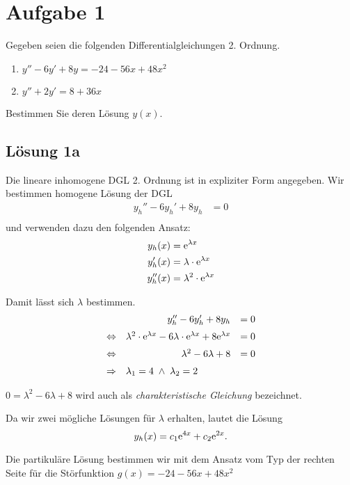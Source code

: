 \documentclass[main.tex]{subfiles}
\begin{document}
\section{Aufgabe 1}
Gegeben seien die folgenden Differentialgleichungen 2. Ordnung.
\begin{enumerate}
    \item $y'' - 6y' + 8y = -24 -56x + 48x^2$
    \item $y'' + 2y' = 8 + 36x$
\end{enumerate}
Bestimmen Sie deren Lösung $y(x)$.

\subsection{Lösung 1a}
Die lineare inhomogene DGL 2. Ordnung ist in expliziter Form angegeben.
Wir bestimmen homogene Lösung der DGL
\begin{align*}
    y_h'' - 6y_h' + 8y_h &= 0 \\
\end{align*}
und verwenden dazu den folgenden Ansatz:
\begin{align*}
    y_h(x) &= \mathrm{e}^{\lambda x} \\
    y_h'(x) &= \lambda\cdot \mathrm{e}^{\lambda x} \\
    y_h''(x) &= \lambda^2 \cdot \mathrm{e}^{\lambda x} \\
\end{align*}

Damit lässt sich $\lambda$ bestimmen.
\begin{equation*}
\begin{array}[pos]{lrl}
                & y_h'' - 6y_h' + 8y_h &= 0 \\[2mm]
\Leftrightarrow & \lambda^2 \cdot \ct{e}^{\lambda x} - 6\lambda\cdot \ct{e}^{\lambda x} + 8\ct{e}^{\lambda x} &= 0 \\[2mm]
\Leftrightarrow & \lambda^2 -6\lambda +8 &= 0\\[2mm]
\Rightarrow & \multicolumn{2}{l}{\lambda_1 = 4\; \land\; \lambda_2 = 2} \\
\end{array}
\end{equation*}

$0 = \lambda^2 -6\lambda +8$ wird auch als \textit{charakteristische Gleichung} bezeichnet. 

Da wir zwei mögliche Lösungen für $\lambda$ erhalten, lautet die Lösung
$$
    y_h(x) = c_1\mathrm{e}^{4x} + c_2\mathrm{e}^{2x}.
$$

Die partikuläre Lösung bestimmen wir mit dem Ansatz vom Typ der rechten Seite für die Störfunktion $g(x) = -24 -56x + 48x^2$
\end{document}
